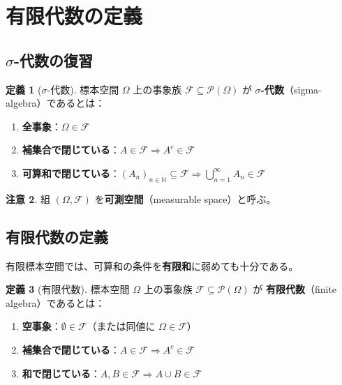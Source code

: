 \documentclass[12pt,a4paper,ja=standard]{bxjsarticle}
\theoremstyle{definition}
\newtheorem{definition}{定義}[section]
\newtheorem{remark}[definition]{注意}
\begin{document}
\section{有限代数の定義}\label{sec:finite-algebra}

\subsection{$\sigma$-代数の復習}

\begin{definition}[$\sigma$-代数]
標本空間 $\Omega$ 上の事象族 $\mathcal{F} \subseteq \mathcal{P}(\Omega)$ が \textbf{$\sigma$-代数}（sigma-algebra）であるとは：

\begin{enumerate}
    \item \textbf{全事象}：$\Omega \in \mathcal{F}$
    \item \textbf{補集合で閉じている}：$A \in \mathcal{F} \Rightarrow A^c \in \mathcal{F}$
    \item \textbf{可算和で閉じている}：$(A_n)_{n \in \mathbb{N}} \subseteq \mathcal{F} \Rightarrow \bigcup_{n=1}^{\infty} A_n \in \mathcal{F}$
\end{enumerate}
\end{definition}

\begin{remark}
組 $(\Omega, \mathcal{F})$ を\textbf{可測空間}（measurable space）と呼ぶ。
\end{remark}

\subsection{有限代数の定義}

有限標本空間では、可算和の条件を\textbf{有限和}に弱めても十分である。

\begin{definition}[有限代数]
標本空間 $\Omega$ 上の事象族 $\mathcal{F} \subseteq \mathcal{P}(\Omega)$ が \textbf{有限代数}（finite algebra）であるとは：

\begin{enumerate}
    \item \textbf{空事象}：$\emptyset \in \mathcal{F}$（または同値に $\Omega \in \mathcal{F}$）
    \item \textbf{補集合で閉じている}：$A \in \mathcal{F} \Rightarrow A^c \in \mathcal{F}$
    \item \textbf{和で閉じている}：$A, B \in \mathcal{F} \Rightarrow A \cup B \in \mathcal{F}$
\end{enumerate}
\end{definition}
\end{document}
